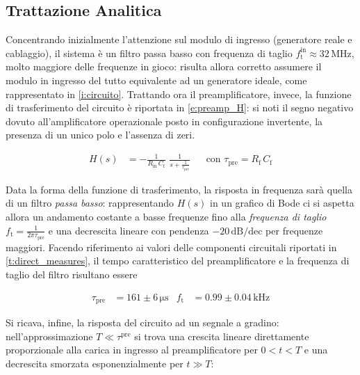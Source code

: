 \documentclass[a4paper,11pt]{article} %
\begin{document}

\subsection{Trattazione Analitica}\label{s:preamp_th} 

Concentrando inizialmente l'attenzione sul modulo di ingresso (generatore reale e cablaggio), il sistema è un filtro
passa basso con frequenza di taglio $f_{\text{t}}^{\text{in}}\approx 32 \,\si{\MHz}$, molto maggiore delle frequenze in
gioco: risulta allora corretto assumere il modulo in ingresso del tutto equivalente ad un generatore ideale, come
rappresentato in \autoref{i:circuito}. Trattando ora il preamplificatore, invece, la funzione di trasferimento del
circuito è riportata in \autoref{e:preamp_H}: si noti il segno negativo dovuto all'amplificatore operazionale posto in
configurazione invertente, la presenza di un unico polo e l'assenza di zeri. 

\begin{align}\label{e:preamp_H} 
	H(s) &= - \frac{ 1 }{ R_{\text{in}}\,C_{\text{f}} } \,\, \frac{1}{ s + \frac{1}{\tau_{\text{pre}} } } 
	& 
	&\text{con} \,\, \tau_{\text{pre}} = R_{\text{f}}\,C_{\text{f}}
\end{align} 

Data la forma della funzione di trasferimento, la risposta in frequenza sarà quella di un filtro \textit{passa basso}:
rappresentando $H(s)$ in un grafico di Bode ci si aspetta allora un andamento costante a basse frequenze fino alla
\textit{frequenza di taglio} $f_{\text{t}}=\frac{1}{2\pi\tau_{\text{pre}}}$ e una decrescita lineare con pendenza
$-20\,\text{dB/dec}$ per frequenze maggiori. Facendo riferimento ai valori delle componenti circuitali riportati in
\autoref{t:direct_measures}, il tempo caratteristico del preamplificatore e la frequenza di taglio del filtro risultano
essere

\begin{align}\label{e:preamp_stime_th}
	\tau_{\text{pre}} & = 161 \pm 6 \,\si{\us}
	&
	f_{\text{t}} & = 0.99 \pm 0.04 \,\si{\kilo\Hz}
\end{align}

Si ricava, infine, la risposta del circuito ad un segnale a gradino: nell'approssimazione $T\ll\tau^{\text{pre}}$ si trova
una crescita lineare direttamente proporzionale alla carica in ingresso al preamplificatore per $0 < t < T$ e una
decrescita smorzata esponenzialmente per $t \gg T$:
\end{document}
